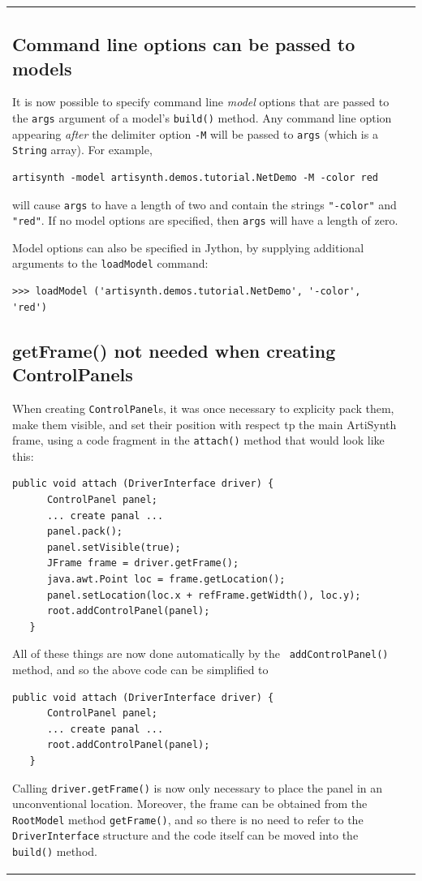 \documentclass{article}
\begin{document}
\begin{tabular}{ll}
\subsection*{Command line options can be passed to models}

It is now possible to specify command line {\it model} options that
are passed to the {\tt args} argument of a model's {\tt build()}
method. Any command line option appearing {\it after} the delimiter
option {\tt -M} will be passed to {\tt args} (which is a {\tt String}
array). For example,
%
\begin{lstlisting}[]
   artisynth -model artisynth.demos.tutorial.NetDemo -M -color red
\end{lstlisting}
%
will cause {\tt args} to have a length of two and contain the
strings {\tt "-color"} and {\tt "red"}. If no model options are
specified, then {\tt args} will have a length of zero.

Model options can also be specified in Jython, by supplying additional
arguments to the {\tt loadModel} command:
%
\begin{lstlisting}[]
   >>> loadModel ('artisynth.demos.tutorial.NetDemo', '-color', 'red')
\end{lstlisting}
%

\subsection*{getFrame() not needed when creating ControlPanels}

When creating {\tt ControlPanel}s, it was once necessary to explicity
pack them, make them visible, and set their position with respect tp
the main ArtiSynth frame, using a code fragment in the {\tt attach()}
method that would look like this:
%
\begin{lstlisting}[]
   public void attach (DriverInterface driver) {
      ControlPanel panel;
      ... create panal ...
      panel.pack();
      panel.setVisible(true);
      JFrame frame = driver.getFrame();
      java.awt.Point loc = frame.getLocation();
      panel.setLocation(loc.x + refFrame.getWidth(), loc.y);
      root.addControlPanel(panel);
   }
\end{lstlisting}
%
All of these things are now done automatically by the {\tt
addControlPanel()} method, and so the above code can be simplified to
%
\begin{lstlisting}[]
   public void attach (DriverInterface driver) {
      ControlPanel panel;
      ... create panal ...
      root.addControlPanel(panel);
   }
\end{lstlisting}
%
Calling {\tt driver.getFrame()} is now only necessary to place the
panel in an unconventional location. Moreover, the frame can be
obtained from the {\tt RootModel} method {\tt getFrame()}, and so
there is no need to refer to the {\tt DriverInterface} structure and
the code itself can be moved into the {\tt build()} method.


\end{tabular}
\end{document}
